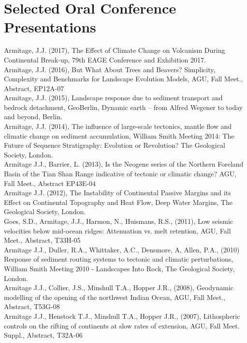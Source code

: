 \section{Selected Oral Conference Presentations}
Armitage, J.J. (2017), The Effect of Climate Change on Volcanism During Continental Break-up, 79th EAGE Conference and Exhibition 2017.\\
Armitage, J.J. (2016), But What About Trees and Beavers? Simplicity, Complexity and Benchmarks for Landscape Evolution Models,  AGU, Fall Meet., Abstract, EP12A-07\\
Armitage, J.J. (2015), Landscape response due to sediment transport and bedrock detachment, GeoBerlin, Dynamic earth – from Alfred Wegener to today and beyond, Berlin.\\
Armitage, J.J. (2014), The influence of large-scale tectonics, mantle flow and climatic change on sediment accumulation, William Smith Meeting 2014: The Future of Sequence Stratigraphy: Evolution or Revolution? The Geological Society, London.\\
Armitage J.J., Barrier, L. (2013), Is the Neogene series of the Northern Foreland Basin of the Tian Shan Range indicative of tectonic or climatic change? AGU, Fall Meet., Abstract EP43E-04 \\
Armitage J.J. (2012), The Instability of Continental Passive Margins and its Effect on Continental Topography and Heat Flow, Deep Water Margins, The Geological Society, London.\\
Goes, S.D., Armitage, J.J., Harmon, N., Huismans, R.S., (2011), Low seismic velocities below mid-ocean ridges: Attenuation vs. melt retention, AGU, Fall Meet., Abstract, T33H-05 \\
Armitage J.J., Duller, R.A., Whittaker, A.C., Densmore, A, Allen, P.A., (2010) Response of sediment routing systems to tectonic and climatic perturbations, William Smith Meeting 2010 - Landscapes Into Rock, The Geological Society, London.\\
Armitage J.J., Collier, J.S., Minshull T.A., Hopper J.R., (2008), Geodynamic modelling of the opening of the northwest Indian Ocean, AGU, Fall Meet., Abstract, T53G-08\\
Armitage J.J., Henstock T.J., Minshull T.A., Hopper J.R., (2007), Lithospheric controls on the rifting of continents at slow rates of extension, AGU, Fall Meet. Suppl., Abstract, T32A-06\\

